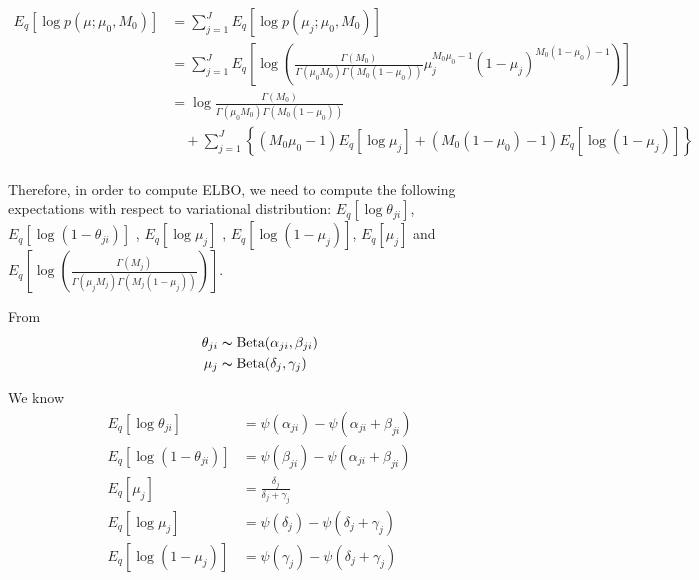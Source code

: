\documentclass[11pt,reqno]{amsart}
\begin{document}
\begin{equation}
\begin{split}
\label{mu}
E_q \left[ \log p\left(\mu ; \mu_0, M_0 \right)\right] &= \sum_{j=1}^{J} E_q  \left[ \log p\left( \mu_j; \mu_0, M_0 \right) \right] \\
&= \sum_{j=1}^{J} E_q  \left[ \log \left( \frac{ \Gamma(M_0) } { \Gamma(\mu_0 M_0) \Gamma(M_0 (1-\mu_0)) } \mu_j^{M_0\mu_0 -1} (1 - \mu_j)^{M_0 ( 1 - \mu_0) - 1} \right) \right] \\
&= \log \frac{ \Gamma(M_0) } { \Gamma(\mu_0 M_0) \Gamma(M_0 (1-\mu_0))} \\
&\quad + \sum_{j=1}^{J} \left\lbrace (M_0\mu_0 -1)E_q  \left[ \log \mu_j \right] + (M_0 ( 1 - \mu_0) - 1) E_q  \left[ \log (1 - \mu_j)\right]\right\rbrace  \\
%
%
\end{split}
\end{equation}

Therefore, in order to compute ELBO, we need to compute the following expectations with respect to variational distribution: $ E_q \left[ \log \theta_{ji} \right] $, $ E_q\left[ \log \left( 1 - \theta_{ji}\right) \right] $ , $ E_q  \left[ \log \mu_j \right] $ , $ E_q  \left[ \log (1 - \mu_j)\right] $, $ E_q \left[ \mu_j \right] $ and $ E_q\left[ \log \left( \frac{ \Gamma(M_j) } { \Gamma(\mu_j M_j) \Gamma(M_j (1-\mu_j)) }\right)\right]  $. %


From 
\begin{align}
\theta_{ji} &\thicksim \text{Beta}(\alpha_{ji}, \beta_{ji}) \nonumber \\
\mu_j &\thicksim \text{Beta}(\delta_j, \gamma_j) \nonumber
\end{align}

We know
\begin{align}
E_q \left[ \log \theta_{ji} \right] &= \psi(\alpha_{ji}) - \psi(\alpha_{ji}+\beta_{ji}) \nonumber \\
E_q\left[ \log \left( 1 - \theta_{ji}\right) \right]&= \psi(\beta_{ji}) - \psi(\alpha_{ji}+\beta_{ji}) \nonumber \nonumber \\
E_q \left[ \mu_j \right] &= \frac{\delta_j}{\delta_j + \gamma_j} \nonumber \\
E_q  \left[ \log \mu_j \right] &= \psi(\delta_j) - \psi(\delta_j+\gamma_j) \nonumber \\
E_q  \left[ \log (1 - \mu_j)\right] &= \psi(\gamma_j) - \psi(\delta_j+\gamma_j)\nonumber \\
\end{align}
\end{document}
